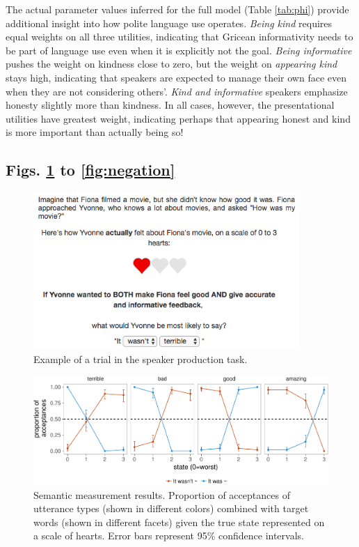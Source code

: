 \documentclass[12pt]{article}
\newcommand{\beginsupplement}{%
        \setcounter{table}{0}
        \renewcommand{\thetable}{S\arabic{table}}%
        \setcounter{figure}{0}
        \renewcommand{\thefigure}{S\arabic{figure}}%
     }
\begin{document}
The actual parameter values inferred for the full model (Table \ref{tab:phi}) provide additional insight into how polite language use operates.
\emph{Being kind} requires equal weights on all three utilities, indicating that Gricean informativity needs to be part of language use even when it is explicitly not the goal.
\emph{Being informative} pushes the weight on kindness close to zero, but the weight on \emph{appearing kind} stays high, indicating that speakers are expected to manage their own face even when they are not considering others'.
\emph{Kind and informative} speakers emphasize honesty slightly more than kindness.
In all cases, however, the presentational utilities have greatest weight, indicating perhaps that appearing honest and kind is more important than actually being so!


\newpage

\subsection*{Figs. \ref{fig:screenshot} to \ref{fig:negation}}\label{supplemental-figures}

\setcounter{figure}{0}
\beginsupplement

\begin{figure}[!h]
\centering
\includegraphics[width=3.98in]{fig/screenshot} \caption{Example of a trial in the speaker production task.}\label{fig:screenshot}
\end{figure}

\begin{figure}[!h]
\includegraphics[width=\textwidth]{polite_manuscript_files/figure-latex/litsem-1} \caption{Semantic measurement results. Proportion of acceptances of utterance types (shown in different colors) combined with target words (shown in different facets) given the true state represented on a scale of hearts. Error bars represent 95\% confidence intervals.}\label{fig:litsem}
\end{figure}
\end{document}

